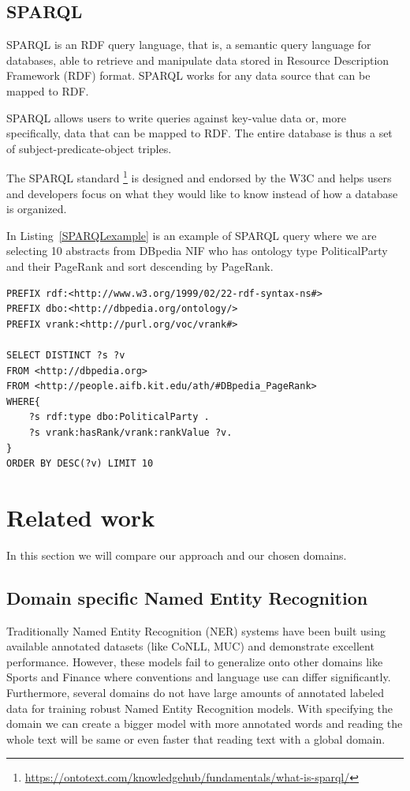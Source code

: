 \documentclass[thesis=M,english]{FITthesis}[2018/05/30]
\begin{document}
\subsection{SPARQL}\label{SPARQL}
	SPARQL \cite{master:SPARQL} is an RDF query language, that is, a semantic query language for databases, able to retrieve and manipulate data stored in Resource Description Framework (RDF) format. SPARQL works for any data source that can be mapped to RDF.

	SPARQL allows users to write queries against key-value data or, more specifically, data that can be mapped to RDF. The entire database is thus a set of subject-predicate-object triples.
	
	The SPARQL standard \footnote{\url{https://ontotext.com/knowledgehub/fundamentals/what-is-sparql/}} is designed and endorsed by the W3C and helps users and developers focus on what they would like to know instead of how a database is organized.

	In Listing~\ref{SPARQLexample} is an example of SPARQL query where we are selecting 10 abstracts from DBpedia NIF who has ontology type PoliticalParty and their PageRank and sort descending by PageRank.   
\begin{lstlisting}[caption=SPARQL example \label{SPARQLexample}]
PREFIX rdf:<http://www.w3.org/1999/02/22-rdf-syntax-ns#>
PREFIX dbo:<http://dbpedia.org/ontology/>
PREFIX vrank:<http://purl.org/voc/vrank#>

SELECT DISTINCT ?s ?v
FROM <http://dbpedia.org>
FROM <http://people.aifb.kit.edu/ath/#DBpedia_PageRank>
WHERE{
	?s rdf:type dbo:PoliticalParty .
	?s vrank:hasRank/vrank:rankValue ?v.
}
ORDER BY DESC(?v) LIMIT 10
\end{lstlisting}

\section{Related work}
In this section we will compare our approach and our chosen domains.

\subsection{Domain specific Named Entity Recognition}
Traditionally Named Entity Recognition (NER)\cite{article:DomainSpecific} systems have been built using available annotated datasets (like CoNLL, MUC) and demonstrate excellent performance. However, these models fail to generalize onto other domains like Sports and Finance where conventions and language use can differ significantly. Furthermore, several domains do not have large amounts of annotated labeled data for training robust Named Entity Recognition models.
With specifying the domain we can create a bigger model with more annotated words and reading the whole text will be same or even faster that reading text with a global domain.  
\end{document}
